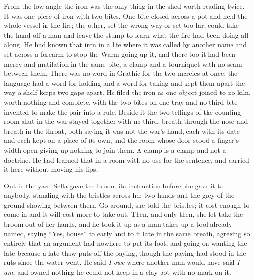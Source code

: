 From the low angle the iron was the only thing in the shed worth reading twice. It was one piece of iron with two bites. One bite closed across a pot and held the whole vessel in the fire; the other, set the wrong way or set too far, could take the hand off a man and leave the stump to learn what the fire had been doing all along. He had known that iron in a life where it was called by another name and set across a forearm to stop the Warm going up it, and there too it had been mercy and mutilation in the same bite, a clamp and a tourniquet with no seam between them. There was no word in Grathic for the two mercies at once; the language had a word for holding and a word for taking and kept them apart the way a shelf keeps two gaps apart. He filed the iron as one object joined to no kiln, worth nothing and complete, with the two bites on one tray and no third bite invented to make the pair into a rule. Beside it the two tellings of the counting room shut in the war stayed together with no third: breath through the nose and breath in the throat, both saying it was not the war's hand, each with its date and each kept on a place of its own, and the room whose door stood a finger's width open giving up nothing to join them. A clamp is a clamp and not a doctrine. He had learned that in a room with no use for the sentence, and carried it here without moving his lips.

\scenebreak

Out in the yard Sella gave the broom its instruction before she gave it to anybody, standing with the bristles across her two hands and the grey of the ground showing between them. Go around, she told the bristles; it cost enough to come in and it will cost more to take out. Then, and only then, she let  take the broom out of her hands, and he took it up as a man takes up a tool already named, saying “Yes, house” to  early and to it late in the same breath, agreeing so entirely that an argument had nowhere to put its foot, and going on wanting the late because a late thaw puts off the paying, though the paying had stood in the ruts since the water went. He said \emph{I owe} where another man would have said \emph{I am}, and owned nothing he could not keep in a clay pot with no mark on it.


